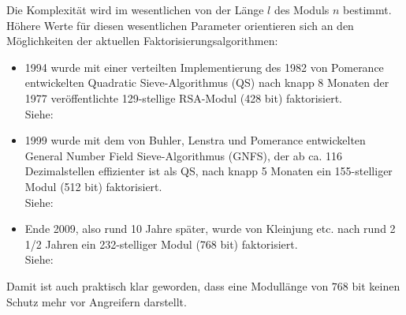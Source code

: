 \begin{refsegment}
Die Komplexität wird im wesentlichen von der Länge $l$ des Moduls $n$
bestimmt. Höhere Werte für diesen wesentlichen Parameter orientieren
sich an den Möglichkeiten der aktuellen Faktorisierungsalgorithmen:

\begin{itemize}
\item 1994 wurde mit einer verteilten Implementierung des 1982 von Pomerance
      entwickelten Quadratic Sieve-Algorithmus (QS)
       nach knapp 8 Monaten der 1977
      veröffentlichte 129-stellige RSA-Modul (428 bit) faktorisiert.\\
      Siehe:

\item 1999 wurde mit dem von Buhler, Lenstra und Pomerance entwickelten
      General Number Field Sieve-Algorithmus (GNFS), der ab ca. 116
      Dezimalstellen effizienter ist als QS, nach knapp 5 Monaten ein
      155-stelliger Modul (512 bit) faktorisiert.
      \\
      Siehe:

\item Ende 2009, also rund 10 Jahre später, wurde von Kleinjung etc.
      nach rund 2 1/2 Jahren ein 232-stelliger Modul (768 bit) faktorisiert.\\
      Siehe:
\end{itemize}

Damit ist auch praktisch klar geworden, dass eine Modullänge von $768$ bit
keinen Schutz mehr vor Angreifern darstellt.


\end{refsegment}
